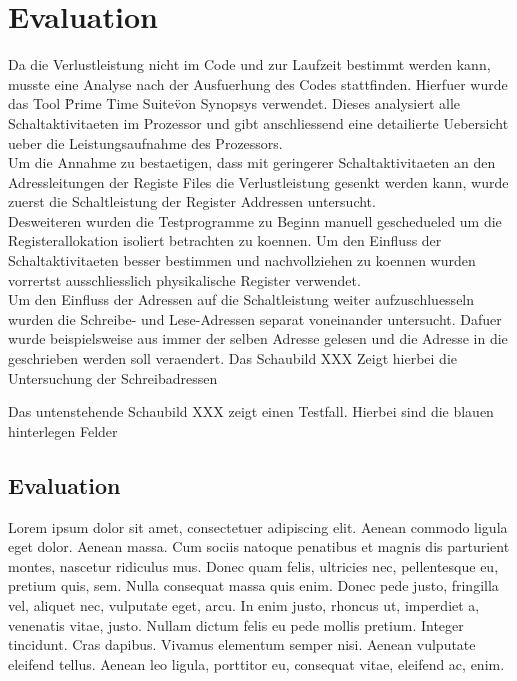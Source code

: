 \chapter{Evaluation}
\label{chap:evaluation}
Da die Verlustleistung nicht im Code und zur Laufzeit bestimmt werden kann, musste eine Analyse nach der Ausfuerhung des Codes stattfinden. Hierfuer wurde das Tool \"Prime Time Suite\" von Synopsys verwendet. Dieses analysiert alle Schaltaktivitaeten im Prozessor und gibt anschliessend eine detailierte Uebersicht ueber die Leistungsaufnahme des Prozessors.\\
Um die Annahme zu bestaetigen, dass mit geringerer Schaltaktivitaeten an den Adressleitungen der Registe Files die Verlustleistung gesenkt werden kann, wurde zuerst die Schaltleistung der Register Addressen untersucht.\\
Desweiteren wurden die Testprogramme zu Beginn manuell geschedueled um die Registerallokation isoliert betrachten zu koennen. Um den Einfluss der Schaltaktivitaeten besser bestimmen und nachvollziehen zu koennen wurden vorrertst ausschliesslich physikalische Register verwendet. \\
Um den Einfluss der Adressen auf die Schaltleistung weiter aufzuschluesseln wurden die Schreibe- und Lese-Adressen separat voneinander untersucht. Dafuer wurde beispielsweise aus immer der selben Adresse gelesen und die Adresse in die geschrieben werden soll veraendert. Das Schaubild XXX Zeigt hierbei die Untersuchung der Schreibadressen

\begin{figure}
	\centering
	
\end{figure}

Das untenstehende Schaubild XXX zeigt einen Testfall. Hierbei sind die blauen hinterlegen Felder 

\section{Evaluation}
\label{sec:evalutation_verification}

Lorem ipsum dolor sit amet, consectetuer adipiscing elit. Aenean commodo ligula eget dolor. Aenean massa. Cum sociis natoque penatibus et magnis dis parturient montes, nascetur ridiculus mus. Donec quam felis, ultricies nec, pellentesque eu, pretium quis, sem. Nulla consequat massa quis enim. Donec pede justo, fringilla vel, aliquet nec, vulputate eget, arcu. In enim justo, rhoncus ut, imperdiet a, venenatis vitae, justo. Nullam dictum felis eu pede mollis pretium. Integer tincidunt. Cras dapibus. Vivamus elementum semper nisi. Aenean vulputate eleifend tellus. Aenean leo ligula, porttitor eu, consequat vitae, eleifend ac, enim.